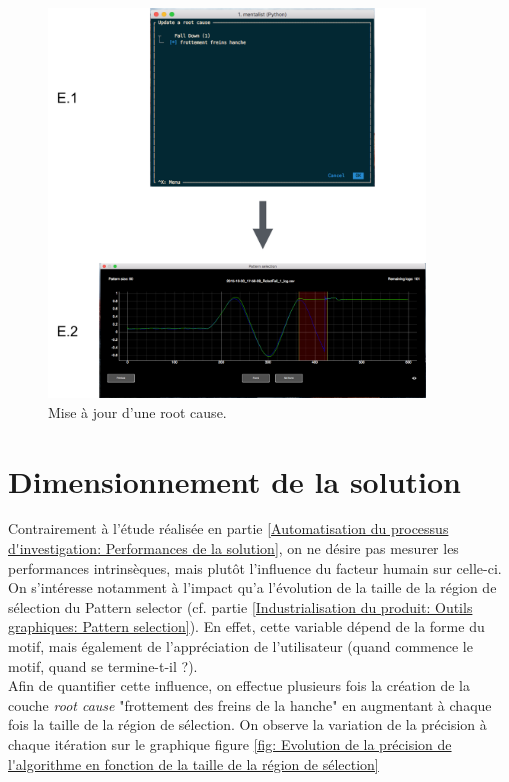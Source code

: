 \begin{figure}[H]
	\centering\includegraphics[width=10cm]{images/update_menu.png}
	\caption[Mise à jour d'une root cause]{Mise à jour d'une root cause.}
	\label{fig: Mise à jour d'une root cause}
\end{figure} 


\section{Dimensionnement de la solution}
\label{Industrialisation du produit: Dimensionnement de la solution}
Contrairement à l'étude réalisée en partie \ref{Automatisation du processus d'investigation: Performances de la solution}, on ne désire pas mesurer les performances intrinsèques, mais plutôt l'influence du facteur humain sur celle-ci. On s'intéresse notamment à l'impact qu'a l'évolution de la taille de la région de sélection du Pattern selector (cf. partie \ref{Industrialisation du produit: Outils graphiques: Pattern selection}). En effet, cette variable dépend de la forme du motif, mais également de l'appréciation de l'utilisateur (quand commence le motif, quand se termine-t-il ?). \\
Afin de quantifier cette influence, on effectue plusieurs fois la création de la couche \emph{root cause}  "frottement des freins de la hanche" en augmentant à chaque fois la taille de la région de sélection. On observe la variation de la précision à chaque itération sur le graphique figure \ref{fig: Evolution de la précision de l'algorithme en fonction de la taille de la région de sélection}

